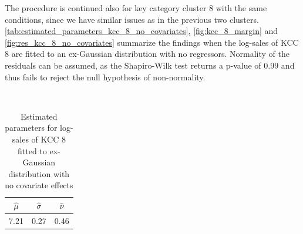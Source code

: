 
The procedure is continued also for key category cluster 8 with the same conditions, since we have similar issues as in the previous two clusters.
\\

\autoref{tab:estimated_parameters_kcc_8_no_covariates}, \autoref{fig:kcc_8_margin} and \autoref{fig:res_kcc_8_no_covariates} summarize the findings when the log-sales of \ac{KCC} 8 are fitted to an ex-Gaussian distribution with no regressors. Normality of the residuals can be assumed, as the Shapiro-Wilk test returns a p-value of 0.99 and thus fails to reject the null hypothesis of non-normality.
\\



\begin{table}[H]
\setlength\arrayrulewidth{1pt}  
\centering
\begin{adjustbox}{max width=\textwidth}\
\begin{tabular}{|c|c|c|}
\hline
\rowcolor{lightgray} 
$\hat{\mu}$ & $\hat{\sigma}$ & $\hat{\nu}$ \\ \hline
7.21        & 0.27           & 0.46        \\ \hline
\end{tabular}
\end{adjustbox}
\caption{Estimated parameters for log-sales of KCC 8 fitted to ex-Gaussian distribution with no covariate effects}
\label{tab:estimated_parameters_kcc_8_no_covariates}
\end{table}



